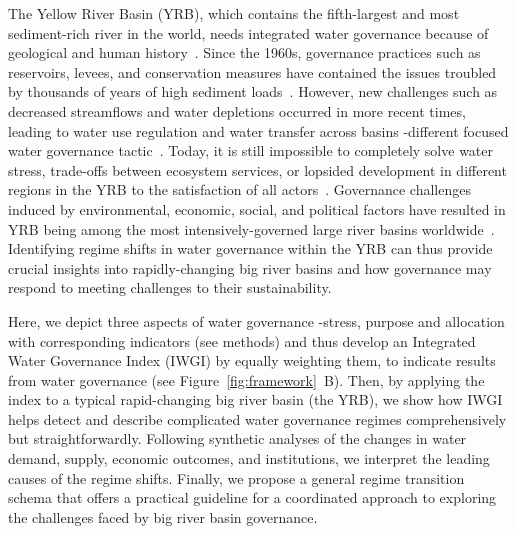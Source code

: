 The Yellow River Basin (YRB), which contains the fifth-largest and most sediment-rich river in the world, needs integrated water governance because of geological and human history~\cite{mostern2021,best2019}.
Since the 1960s, governance practices such as reservoirs, levees, and conservation measures have contained the issues troubled by thousands of years of high sediment loads~\cite{wang2016e,song2020a}.
However, new challenges such as decreased streamflows and water depletions occurred in more recent times, leading to water use regulation and water transfer across basins -different focused water governance tactic~\cite{wang2019c}.
Today, it is still impossible to completely solve water stress, trade-offs between ecosystem services, or lopsided development in different regions in the YRB to the satisfaction of all actors~\cite{wohlfart2016a}.
Governance challenges induced by environmental, economic, social, and political factors have resulted in YRB being among the most intensively-governed large river basins worldwide~\cite{nickum2021}.
Identifying regime shifts in water governance within the YRB can thus provide crucial insights into rapidly-changing big river basins and how governance may respond to meeting challenges to their sustainability.

Here, we depict three aspects of water governance -stress, purpose and allocation with corresponding indicators (see methods) and thus develop an Integrated Water Governance Index (IWGI) by equally weighting them, to indicate results from water governance (see Figure~\ref{fig:framework}~B).
Then, by applying the index to a typical rapid-changing big river basin (the YRB), we show how IWGI helps detect and describe complicated water governance regimes comprehensively but straightforwardly.
Following synthetic analyses of the changes in water demand, supply, economic outcomes, and institutions, we interpret the leading causes of the regime shifts.
Finally, we propose a general regime transition schema that offers a practical guideline for a coordinated approach to exploring the challenges faced by big river basin governance.
